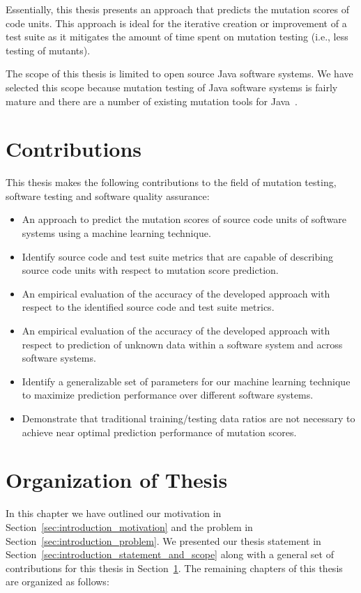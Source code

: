 Essentially, this thesis presents an approach that predicts the mutation scores of code units. This approach is ideal for the iterative creation or improvement of a test suite as it mitigates the amount of time spent on mutation testing (i.e., less testing of mutants).

The scope of this thesis is limited to open source Java software systems. We have selected this scope because mutation testing of Java software systems is fairly mature and there are a number of existing mutation tools for Java~\cite{JH10}.


\section{Contributions}
\label{sec:introduction_contributions}
This thesis makes the following contributions to the field of mutation testing, software testing and software quality assurance:

\begin{itemize}
  \item An approach to predict the mutation scores of source code units of software systems using a machine learning technique.
  \item Identify source code and test suite metrics that are capable of describing source code units with respect to mutation score prediction.
  \item An empirical evaluation of the accuracy of the developed approach with respect to the identified source code and test suite metrics.
  \item An empirical evaluation of the accuracy of the developed approach with respect to prediction of unknown data within a software system and across software systems.
  \item Identify a generalizable set of parameters for our machine learning technique to maximize prediction performance over different software systems.
  \item Demonstrate that traditional training/testing data ratios are not necessary to achieve near optimal prediction performance of mutation scores.
\end{itemize}


\section{Organization of Thesis}
\label{sec:introduction_organization}
In this chapter we have outlined our motivation in Section~\ref{sec:introduction_motivation} and the problem in Section~\ref{sec:introduction_problem}. We presented our thesis statement in Section~\ref{sec:introduction_statement_and_scope} along with a general set of contributions for this thesis in Section~\ref{sec:introduction_contributions}. The remaining chapters of this thesis are organized as follows:

